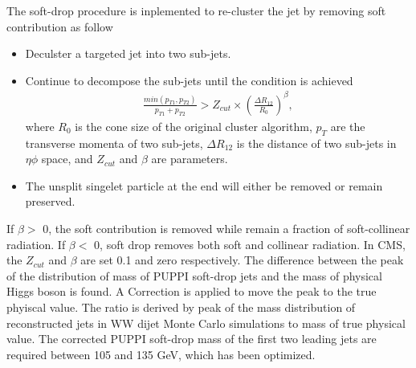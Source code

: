 The soft-drop procedure is inplemented to re-cluster the jet by removing soft contribution as follow\citep{Larkoski:2014wba}
\begin{itemize}
\item Deculster a targeted jet into two sub-jets.
\item Continue to decompose the sub-jets until the condition is achieved
\begin{equation} \label{eq5}
\begin{split}
\frac{min(p_{T1},p_{T2})}{p_{T1}+p_{T2}} > Z_{cut} \times (\frac{\Delta R_{12}}{R_0})^{\beta}, 
\end{split}
\end{equation}
where $R_0$ is the cone size of the original cluster algorithm, $p_T$ are the transverse momenta of two sub-jets, $\Delta R_{12}$ is the distance of two sub-jets in $\eta \phi$ space, and $Z_{cut}$ and $\beta $ are parameters. 
\item The unsplit singelet particle at the end will either be removed or remain preserved.
\end{itemize} 
If $\beta  >$ 0, the soft contribution is removed while remain a fraction of soft-collinear radiation. 
If $\beta  <$ 0, soft drop removes both soft and collinear radiation.
In CMS, the $Z_{cut}$ and $\beta $ are set 0.1 and zero respectively.
The difference between the peak of the distribution of mass of PUPPI soft-drop jets and the mass of physical Higgs boson is found\citep{CMS-AN-16-235}.
A Correction is applied to move the peak to the true phyiscal value. 
The ratio is derived by peak of the mass distribution of reconstructed jets in WW dijet Monte Carlo simulations to mass of true physical value.
The corrected PUPPI soft-drop mass of the first two leading jets are required between 105 and 135 GeV, which has been optimized.
 
